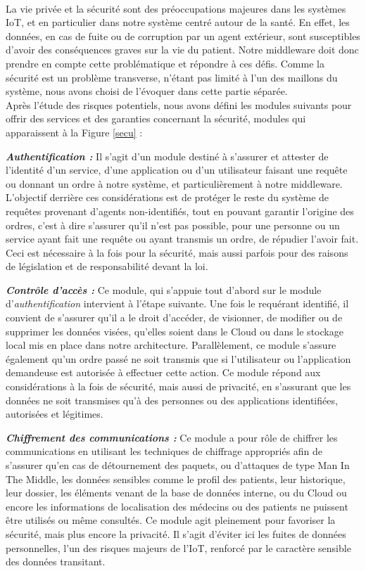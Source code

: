 \paragraph{}
La vie privée et la sécurité sont des préoccupations majeures dans les systèmes IoT, et en particulier dans notre système centré autour de la santé. En effet, les données, en cas de fuite ou de corruption par un agent extérieur, sont susceptibles d'avoir des conséquences graves sur la vie du patient. Notre middleware doit donc prendre en compte cette problématique et répondre à ces défis. Comme la sécurité est un problème transverse, n'étant pas limité à l'un des maillons du système, nous avons choisi de l'évoquer dans cette partie séparée. \\Après l'étude des risques potentiels, nous avons défini les modules suivants pour offrir des services et des garanties concernant la sécurité, modules qui apparaissent à la Figure \ref{secu} :

\textbf{\textit{Authentification :}} Il s'agit d'un module destiné à s'assurer et attester de l'identité d'un service, d'une application ou d'un utilisateur faisant une requête ou donnant un ordre à notre système, et particulièrement à notre middleware. L'objectif derrière ces considérations est de protéger le reste du système de requêtes provenant d'agents non-identifiés, tout en pouvant garantir l'origine des ordres, c'est à dire s'assurer qu'il n'est pas possible, pour une personne ou un service ayant fait une requête ou ayant transmis un ordre, de répudier l'avoir fait. Ceci est nécessaire à la fois pour la sécurité, mais aussi parfois pour des raisons de législation et de responsabilité devant la loi.

\textbf{\textit{Contrôle d'accès :}} Ce module, qui s'appuie tout d'abord sur le module d'\textit{authentification} intervient à l'étape suivante. Une fois le requérant identifié, il convient de s'assurer qu'il a le droit d'accéder, de visionner, de modifier ou de supprimer les données visées, qu'elles soient dans le Cloud ou dans le stockage local mis en place dans notre architecture. Parallèlement, ce module s'assure également qu'un ordre passé ne soit transmis que si l'utilisateur ou l'application demandeuse est autorisée à effectuer cette action. Ce module répond aux considérations à la fois de sécurité, mais aussi de privacité, en s'assurant que les données ne soit transmises qu'à des personnes ou des applications identifiées, autorisées et légitimes.

\textbf{\textit{Chiffrement des communications :}} Ce module a pour rôle de chiffrer les communications en utilisant les techniques de chiffrage appropriés afin de s'assurer qu'en cas de détournement des paquets, ou d'attaques de type Man In The Middle, les données sensibles comme le profil des patients, leur historique, leur dossier, les éléments venant de la base de données interne, ou du Cloud ou encore les informations de localisation des médecins ou des patients ne puissent être utilisés ou même consultés. Ce module agit pleinement pour favoriser la sécurité, mais plus encore la privacité. Il s'agit d'éviter ici les fuites de données personnelles, l'un des risques majeurs de l'IoT, renforcé par le caractère sensible des données transitant.

